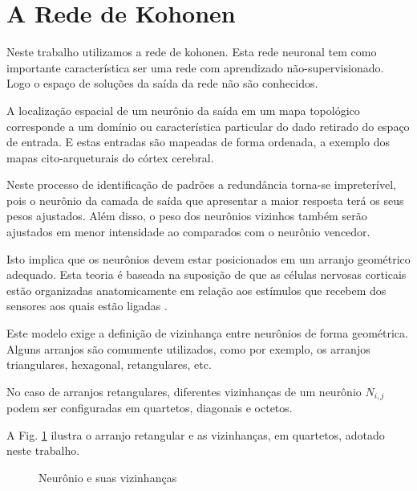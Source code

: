 \section{A Rede de Kohonen}

Neste trabalho utilizamos a rede de kohonen. Esta rede neuronal tem como importante característica ser uma rede com aprendizado não-supervisionado. Logo o espaço de soluções da saída da rede não são conhecidos. 

A localização espacial de um neurônio da saída em um mapa topológico
corresponde a um domínio ou característica particular do dado retirado do espaço
de entrada. E estas entradas são mapeadas de forma ordenada, a exemplo dos mapas
cito-arqueturais do córtex cerebral.

Neste processo de identificação de padrões a redundância torna-se impreterível,
pois o neurônio da camada de saída que apresentar a maior resposta terá os seus
pesos ajustados. Além disso, o peso dos neurônios vizinhos também serão
ajustados em menor intensidade ao comparados com o neurônio vencedor.

Isto implica que os neurônios devem estar posicionados em um arranjo geométrico
adequado. Esta teoria é baseada na suposição de que as células nervosas
corticais estão organizadas anatomicamente em relação aos estímulos que recebem
dos sensores aos quais estão ligadas \citep{Artero2009}.

Este modelo exige a definição de vizinhança entre neurônios de forma geométrica.
Alguns arranjos são comumente utilizados, como por exemplo, os arranjos
triangulares, hexagonal, retangulares, etc.

No caso de arranjos retangulares, diferentes vizinhanças de um neurônio
$N_{i,j}$ podem ser configuradas em quartetos, diagonais e octetos. 

A Fig. \ref{hiperplano} ilustra o arranjo retangular e as vizinhanças, em quartetos, adotado neste trabalho. 

\begin{figure}[H]
	\centering
	\setlength{\fboxsep}{8pt}
	\setlength{\fboxrule}{0.1pt}
	\caption{Neurônio e suas vizinhanças}
	\label{hiperplano}
\end{figure}


